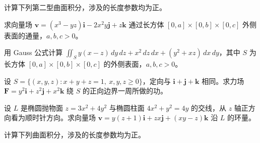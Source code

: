 \newpage
\noindent\begin{minipage}{\textwidth}
计算下列第二型曲面积分，涉及的长度参数均为正。
\end{minipage}\par\vfill
\noindent\begin{minipage}{\textwidth}
求向量场 $\boldsymbol v=(x^3-yz)\boldsymbol i-2x^2y\boldsymbol j+z\boldsymbol k$ 通过长方体 $[0,a]\times[0,b]\times[0,c]$ 外侧表面的通量，$a,b,c>0$。
\end{minipage}\par\vfill
\noindent\begin{minipage}{\textwidth}
用 Gauss 公式计算 $\iint_Sy(x-z)\,dy\,dz+x^2\,dz\,dx+(y^2+xz)\,dx\,dy$，其中 $S$ 为长方体 $[0,a]\times[0,b]\times[0,c]$ 的外侧表面，$a,b,c>0$。
\end{minipage}\par\vfill
\noindent\begin{minipage}{\textwidth}
设 $S=\{(x,y,z):x+y+z=1,\ x,y,z\ge0\}$，定向与 $\boldsymbol i+\boldsymbol j+\boldsymbol k$ 相同。求力场 $\boldsymbol F=y^2\boldsymbol i+z^2\boldsymbol j+x^2\boldsymbol k$ 绕 $S$ 的正向边界一周所做的功。
\end{minipage}\par\vfill
\newpage
\noindent\begin{minipage}{\textwidth}
设 $L$ 是椭圆抛物面 $z=3x^2+4y^2$ 与椭圆柱面 $4x^2+y^2=4y$ 的交线，从 $z$ 轴正方向看为顺时针方向。求向量场 $\boldsymbol v=y(z+1)\boldsymbol i+zx\boldsymbol j+(xy-z)\boldsymbol k$ 沿 $L$ 的环量。
\end{minipage}\par\vfill
\noindent\begin{minipage}{\textwidth}
计算下列曲面积分，涉及的长度参数均为正。
\end{minipage}\par\vfill
